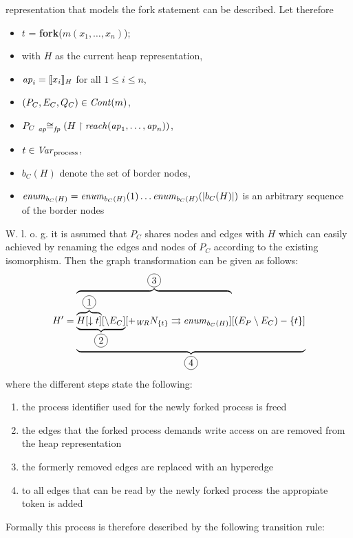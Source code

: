 	representation that models the fork statement can be described.
	Let therefore
	\begin{itemize}
		\item $t$ = \textbf{fork}($m(x_1,\dots,x_n)$);
		\item with $H$ as the current heap representation,
		\item $\ap_{i} = \llbracket x_{i}\rrbracket_{H}$ for all $1\leq i\leq n$,
		\item $(P_{C},E_{C},Q_{C})\in\Cont(m)$,
		\item $P_{C}\afiso (H\upharpoonright \reach(\ap_{1},\dots,\ap_{n}))$,
		\item $t\in\PI$,
		\item $b_{C}(H)$ denote the set of border nodes,
		\item $\enum_{b_{C}(H)} =
			\enum_{b_{C}(H)}(1)\dots\enum_{b_{C}(H)}(|b_{C}(H)|)$ is an arbitrary
			sequence of the border nodes
	\end{itemize}
	W. l. o. g. it is assumed that $P_C$ shares nodes and edges with $H$ which
	can easily achieved by renaming the edges and nodes of $P_C$ according to
	the existing isomorphism. Then the graph transformation can be given as
	follows:
	\begin{equation*}
		\label{eq:H'}
		H' = \underbrace{\overbrace{\underbrace{
		\overbrace{H[\downarrow t]}^{\circled{1}}[\setminus E_{C}]}_{\circled{2}}
		[+_{\mathit{WR}}N_{\{t\}}\rightrightarrows
		\enum_{b_{C}(H)}]}^{\circled{3}}[(E_{P}\setminus E_{C})-\{t\}]}_{
		\circled{4}}
	\end{equation*}
	where the different steps state the following:
	\begin{enumerate}[label=\protect\circled{\arabic*}]
		\item the process identifier used for the newly forked process is freed
		\item the edges that the forked process demands write access on are
			removed from the heap representation
		\item the formerly removed edges are replaced with an hyperedge
		\item to all edges that can be read by the newly forked process the
			appropiate token is added
	\end{enumerate}
	Formally this process is therefore described by the following transition
	rule:
	\begin{prooftree}
		\label{prooftree:fork}
	\end{prooftree}

